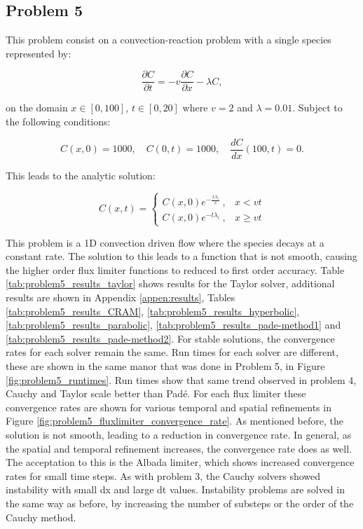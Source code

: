\clearpage

\subsection{Problem 5}
This problem consist on a convection-reaction problem with a single species represented by:

\begin{equation}
    \frac{\partial C}{\partial t} = -v\frac{\partial C}{\partial x} - \lambda C,
\end{equation}

\noindent on the domain $x \in [0,100]$, $t \in [0,20]$ where $v = 2$ and $\lambda = 0.01$. Subject to the following conditions:

\begin{equation}
    C(x, 0) = 1000, \quad C(0,t) = 1000, \quad \frac{dC}{dx}(100, t) = 0.
\end{equation}

\noindent This leads to the analytic solution:

\begin{equation}
C (x,t) = \begin{cases}
  C (x, 0) e^{-\frac{x \lambda _i}{v}}\ , & x < vt \\
  C (x, 0) e^{-t \lambda _i}\ , & x \ge vt
\end{cases}
\end{equation}

This problem is a 1D convection driven flow where the species decays at a constant rate. The solution to this leads to a function that is not smooth, causing the higher order flux limiter functions to reduced to first order accuracy. Table \ref{tab:problem5_results_taylor} shows results for the Taylor solver, additional results are shown in Appendix \ref{appen:results}, Tables \ref{tab:problem5_results_CRAM}, \ref{tab:problem5_results_hyperbolic}, \ref{tab:problem5_results_parabolic}, \ref{tab:problem5_results_pade-method1} and \ref{tab:problem5_results_pade-method2}. For stable solutions, the convergence rates for each solver remain the same. Run times for each solver are different, these are shown in the same manor that was done in Problem 5, in Figure \ref{fig:problem5_runtimes}. Run times show that same trend observed in problem 4, Cauchy and Taylor scale better than Pad\'e. For each flux limiter these convergence rates are shown for various temporal and spatial refinements in Figure \ref{fig:problem5_fluxlimiter_convergence_rate}. As mentioned before, the solution is not smooth, leading to a reduction in convergence rate. In general, as the spatial and temporal refinement increases, the convergence rate does as well. The acceptation to this is the Albada limiter, which shows increased convergence rates for small time steps. As with problem 3, the Cauchy solvers showed instability with small dx and large dt values. Instability problems are solved in the same way as before, by increasing the number of substeps or the order of the Cauchy method. 

